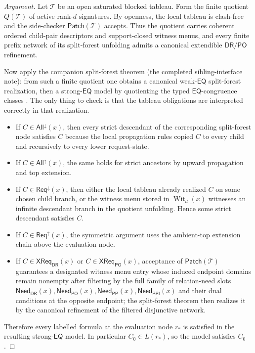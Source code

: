 \documentclass[11pt]{article}
\theoremstyle{remark}
\newcommand{\DR}{\mathsf{DR}}
\newcommand{\PO}{\mathsf{PO}}
\newcommand{\PP}{\mathsf{PP}}
\newcommand{\PPI}{\mathsf{PPI}}
\newcommand{\EQ}{\mathsf{EQ}}
\newcommand{\Wit}{\operatorname{Wit}}
\newcommand{\ReqUp}{\mathsf{Req}^{\uparrow}}
\newcommand{\ReqDown}{\mathsf{Req}^{\downarrow}}
\newcommand{\AllUp}{\mathsf{All}^{\uparrow}}
\newcommand{\AllDown}{\mathsf{All}^{\downarrow}}
\newcommand{\CrossDR}{\mathsf{XReq}_{\DR}}
\newcommand{\CrossPO}{\mathsf{XReq}_{\PO}}
\newcommand{\NeedDR}{\mathsf{Need}_{\DR}}
\newcommand{\NeedPO}{\mathsf{Need}_{\PO}}
\newcommand{\NeedPP}{\mathsf{Need}_{\PP}}
\newcommand{\NeedPPI}{\mathsf{Need}_{\PPI}}
\begin{document}
\begin{proof}[Argument]
Let $\mathcal T$ be an open saturated blocked tableau. Form the finite quotient $Q(\mathcal T)$ of active rank-$d$ signatures. By openness, the local tableau is clash-free and the side-checker $\mathsf{Patch}(\mathcal T)$ accepts. Thus the quotient carries coherent ordered child-pair descriptors and support-closed witness menus, and every finite prefix network of its split-forest unfolding admits a canonical extendible $\DR/\PO$ refinement.

Now apply the companion split-forest theorem (the completed sibling-interface note): from such a finite quotient one obtains a canonical weak-$\EQ$ split-forest realization, then a strong-$\EQ$ model by quotienting the typed $\EQ$-congruence classes \cite{SiblingCompleted}. The only thing to check is that the tableau obligations are interpreted correctly in that realization.
\begin{itemize}
    \item If $C\in \AllDown(x)$, then every strict descendant of the corresponding split-forest node satisfies $C$ because the local propagation rules copied $C$ to every child and recursively to every lower request-state.
    \item If $C\in \AllUp(x)$, the same holds for strict ancestors by upward propagation and top extension.
    \item If $C\in \ReqDown(x)$, then either the local tableau already realized $C$ on some chosen child branch, or the witness menu stored in $\Wit_d(x)$ witnesses an infinite descendant branch in the quotient unfolding. Hence some strict descendant satisfies $C$.
    \item If $C\in \ReqUp(x)$, the symmetric argument uses the ambient-top extension chain above the evaluation node.
    \item If $C\in \CrossDR(x)$ or $C\in \CrossPO(x)$, acceptance of $\mathsf{Patch}(\mathcal T)$ guarantees a designated witness menu entry whose induced endpoint domains remain nonempty after filtering by the full family of relation-need slots $\NeedDR(x),\NeedPO(x),\NeedPP(x),\NeedPPI(x)$ and their dual conditions at the opposite endpoint; the split-forest theorem then realizes it by the canonical refinement of the filtered disjunctive network.
\end{itemize}
Therefore every labelled formula at the evaluation node $r_\ast$ is satisfied in the resulting strong-$\EQ$ model. In particular $C_0\in L(r_\ast)$, so the model satisfies $C_0$.
\end{proof}
\end{document}
